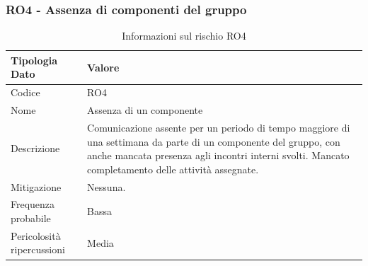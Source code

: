 \documentclass[a4paper,12pt]{article}
\begin{document}
\subsubsection{RO4 - Assenza di componenti del gruppo}
\begin{table}[H]
    \centering
    \renewcommand{\arraystretch}{1.4}
    \begin{tabularx}{\textwidth}{|L|Z|}
        \hline
        \textbf{Tipologia Dato} & \textbf{Valore} \\
        \hline
        Codice & RO4 \\
        \hline
        Nome & Assenza di un componente \\
        \hline
        Descrizione & Comunicazione assente per un periodo di tempo maggiore di una settimana da parte di un componente del gruppo, con anche mancata presenza agli incontri interni svolti. Mancato completamento delle attività assegnate.\\
        \hline
        Mitigazione & Nessuna. \\
        \hline
        Frequenza probabile & Bassa \\
        \hline
        Pericolosità ripercussioni & Media \\
        \hline
    \end{tabularx}
    \caption{Informazioni sul rischio RO4}
    \label{tab:RO4}
\end{table}
\end{document}
